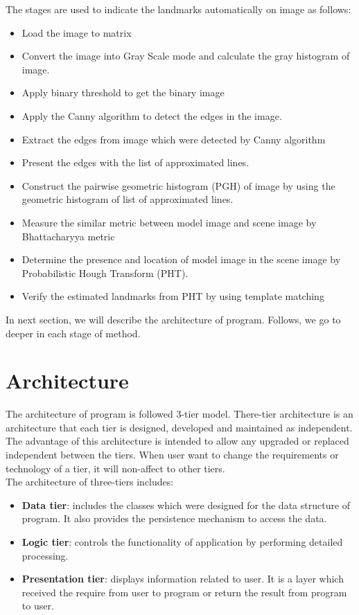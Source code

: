 \documentclass[12pt, a4paper]{article}
\begin{document}
The stages are used to indicate the landmarks automatically on image  as follows:
\begin{itemize}
	\item Load the image to matrix
	\item Convert the image into Gray Scale mode and calculate the gray histogram of image. 
	\item Apply binary threshold to get the binary image
	\item Apply the Canny algorithm to detect the edges in the image. 
	\item Extract the edges from image which were detected by Canny algorithm
	\item Present the edges with the list of approximated lines.
	\item Construct the pairwise geometric histogram (PGH) of image by using the geometric histogram of list of approximated lines.
	\item Measure the similar metric between model image and scene image by Bhattacharyya metric
	\item Determine the presence and location of model image in the scene image by Probabilistic Hough Transform (PHT).
	\item Verify the estimated landmarks from PHT by using template matching
\end{itemize}
In next section, we will describe the architecture of program. Follows, we go to deeper in each stage of method.
\section{Architecture}
The architecture of program is followed 3-tier model. There-tier architecture is an architecture that each tier is designed, developed and maintained as independent. The advantage of this architecture is intended to allow any upgraded or replaced independent between the tiers. When user want to change the requirements or technology of a tier, it will non-affect to other tiers.\\[0.3cm]
The architecture of three-tiers includes:
\begin{itemize}
	\item \textbf{Data tier}: includes the classes which were designed for the data structure of program. It also provides the persistence mechanism to access the data.
	\item \textbf{Logic tier}: controls the functionality of application by performing detailed processing.
	\item \textbf{Presentation tier}: displays information related to user. It is a layer which received the require from user to program or return the result from program to user. 
\end{itemize}
\end{document}

